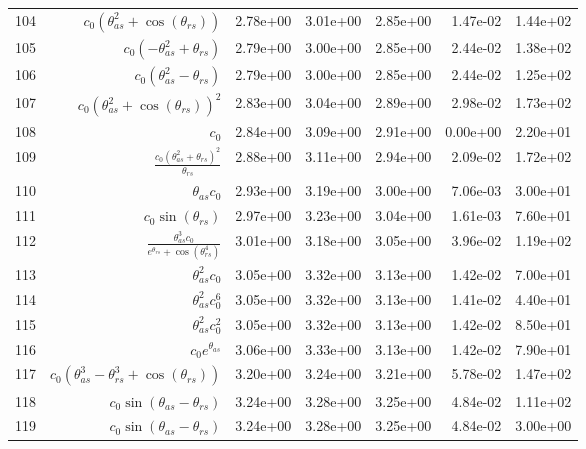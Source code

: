 \begin{tabularx}{\textwidth}{lRRRRRl}
104  &  $ c_{0} \left(\theta_{as}^{2} + \cos{\left(\theta_{rs} \right)}\right) $  &  2.78e+00  &  3.01e+00  &  2.85e+00  &  1.47e-02  &  1.44e+02  \\ 
105  &  $ c_{0} \left(- \theta_{as}^{2} + \theta_{rs}\right) $  &  2.79e+00  &  3.00e+00  &  2.85e+00  &  2.44e-02  &  1.38e+02  \\ 
106  &  $ c_{0} \left(\theta_{as}^{2} - \theta_{rs}\right) $  &  2.79e+00  &  3.00e+00  &  2.85e+00  &  2.44e-02  &  1.25e+02  \\ 
107  &  $ c_{0} \left(\theta_{as}^{2} + \cos{\left(\theta_{rs} \right)}\right)^{2} $  &  2.83e+00  &  3.04e+00  &  2.89e+00  &  2.98e-02  &  1.73e+02  \\ 
108  &  $ c_{0} $  &  2.84e+00  &  3.09e+00  &  2.91e+00  &  0.00e+00  &  2.20e+01  \\ 
109  &  $ \displaystyle\frac{c_{0} \left(\theta_{as}^{2} + \theta_{rs}\right)^{2}}{\theta_{rs}} $  &  2.88e+00  &  3.11e+00  &  2.94e+00  &  2.09e-02  &  1.72e+02  \\ 
110  &  $ \theta_{as} c_{0} $  &  2.93e+00  &  3.19e+00  &  3.00e+00  &  7.06e-03  &  3.00e+01  \\ 
111  &  $ c_{0} \sin{\left(\theta_{rs} \right)} $  &  2.97e+00  &  3.23e+00  &  3.04e+00  &  1.61e-03  &  7.60e+01  \\ 
112  &  $ \displaystyle\frac{\theta_{as}^{3} c_{0}}{e^{\theta_{rs}} + \cos{\left(\theta_{rs}^{4} \right)}} $  &  3.01e+00  &  3.18e+00  &  3.05e+00  &  3.96e-02  &  1.19e+02  \\ 
113  &  $ \theta_{as}^{2} c_{0} $  &  3.05e+00  &  3.32e+00  &  3.13e+00  &  1.42e-02  &  7.00e+01  \\ 
114  &  $ \theta_{as}^{2} c_{0}^{6} $  &  3.05e+00  &  3.32e+00  &  3.13e+00  &  1.41e-02  &  4.40e+01  \\ 
115  &  $ \theta_{as}^{2} c_{0}^{2} $  &  3.05e+00  &  3.32e+00  &  3.13e+00  &  1.42e-02  &  8.50e+01  \\ 
116  &  $ c_{0} e^{\theta_{as}} $  &  3.06e+00  &  3.33e+00  &  3.13e+00  &  1.42e-02  &  7.90e+01  \\ 
117  &  $ c_{0} \left(\theta_{as}^{3} - \theta_{rs}^{3} + \cos{\left(\theta_{rs} \right)}\right) $  &  3.20e+00  &  3.24e+00  &  3.21e+00  &  5.78e-02  &  1.47e+02  \\ 
118  &  $ c_{0} \sin{\left(\theta_{as} - \theta_{rs} \right)} $  &  3.24e+00  &  3.28e+00  &  3.25e+00  &  4.84e-02  &  1.11e+02  \\ 
119  &  $ c_{0} \sin{\left(\theta_{as} - \theta_{rs} \right)} $  &  3.24e+00  &  3.28e+00  &  3.25e+00  &  4.84e-02  &  3.00e+00  \\ 

\end{tabularx}
